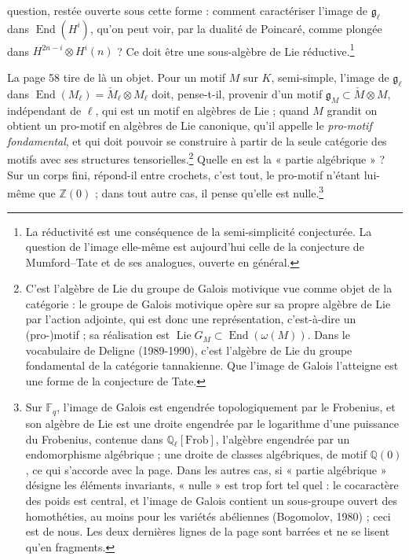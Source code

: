 \documentclass[11pt,a4paper]{article}
\begin{document}
question, restée ouverte sous cette forme : comment caractériser l'image de
$\mathfrak{g}_{\ell}$ dans $\operatorname{End}(H^{i})$, qu'on peut voir, par la
dualité de Poincaré, comme plongée dans $H^{2n-i} \otimes H^{i}(n)$ ? Ce doit
être une sous-algèbre de Lie réductive.\footnote{La réductivité est une conséquence de la semi-simplicité
conjecturée. La question de l'image elle-même est aujourd'hui celle de la
conjecture de Mumford--Tate et de ses analogues, ouverte en général.}

La page 58 tire de là un objet. Pour un motif $M$ sur $K$, semi-simple, l'image
de $\mathfrak{g}_{\ell}$ dans $\operatorname{End}(M_{\ell}) = \check{M}_{\ell}
\otimes M_{\ell}$ doit, pense-t-il, provenir d'un motif $\mathfrak{g}_{M} \subset \check{M}
\otimes M$, indépendant de $\ell$, qui est un motif en algèbres de Lie ; quand
$M$ grandit on obtient un pro-motif en algèbres de Lie canonique, qu'il appelle
le \emph{pro-motif fondamental}, et qui doit pouvoir se construire à partir de la
seule catégorie des motifs avec ses structures tensorielles.\footnote{C'est
l'algèbre de Lie du groupe de Galois motivique vue comme objet de la catégorie :
le groupe de Galois motivique opère sur sa propre algèbre de Lie par l'action
adjointe, qui est donc une représentation, c'est-à-dire un (pro-)motif ; sa
réalisation est $\operatorname{Lie} G_{M} \subset \operatorname{End}(\omega(M))$.
Dans le vocabulaire de Deligne (1989-1990), c'est l'algèbre de Lie du groupe
fondamental de la catégorie tannakienne. Que l'image de Galois l'atteigne est une
forme de la conjecture de Tate.} Quelle en est la « partie algébrique » ? Sur
un corps fini, répond-il entre crochets, c'est tout, le pro-motif n'étant
lui-même que $\mathbb{Z}(0)$ ; dans tout autre cas, il pense qu'elle est
nulle.\footnote{Sur $\mathbb{F}_{q}$, l'image de Galois est engendrée
topologiquement par le Frobenius, et son algèbre de Lie est une droite
engendrée par le logarithme d'une puissance du Frobenius, contenue dans
$\mathbb{Q}_{\ell}[\mathrm{Frob}]$, l'algèbre engendrée par un endomorphisme
algébrique ; une droite de classes algébriques, de motif $\mathbb{Q}(0)$, ce qui
s'accorde avec la page. Dans les autres cas, si « partie algébrique » désigne
les éléments invariants, « nulle » est trop fort tel quel : le cocaractère des
poids est central, et l'image de Galois contient un sous-groupe ouvert des
homothéties, au moins pour les variétés abéliennes (Bogomolov, 1980) ; ceci est
de nous. Les deux dernières lignes de la page sont barrées et ne se lisent
qu'en fragments.}
\end{document}
